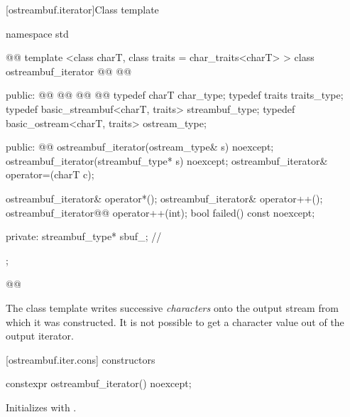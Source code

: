\begin{itemdescr}
\pnum
{}
\end{itemdescr}

[ostreambuf.iterator]{Class template }

%
\begin{codeblock}
namespace std { @@
  template <class charT, class traits = char_traits<charT> >
  class ostreambuf_iterator @\removed{:}@
    @@ {
  public:
    @@            @@
    @@                      @@
    typedef charT                          char_type;
    typedef traits                         traits_type;
    typedef basic_streambuf<charT, traits> streambuf_type;
    typedef basic_ostream<charT, traits>   ostream_type;

  public:
    @@
    ostreambuf_iterator(ostream_type& s) noexcept;
    ostreambuf_iterator(streambuf_type* s) noexcept;
    ostreambuf_iterator& operator=(charT c);

    ostreambuf_iterator& operator*();
    ostreambuf_iterator& operator++();
    ostreambuf_iterator@\oldoldtxt{\&}@ operator++(int);
    bool failed() const noexcept;

  private:
    streambuf_type* sbuf_;                // \expos
  };
}@\newtxt{\}\}\}}@
\end{codeblock}

\pnum
The
class template
writes successive
\textit{characters}
onto the output stream from which it was constructed.
It is not possible to get a character value out of the output iterator.

[ostreambuf.iter.cons]{ constructors}

\begin{addedblock}
%
\begin{itemdecl}
constexpr ostreambuf_iterator() noexcept;
\end{itemdecl}

\begin{itemdescr}
\pnum
\effects
Initializes  with .
\end{itemdescr}
\end{addedblock}

